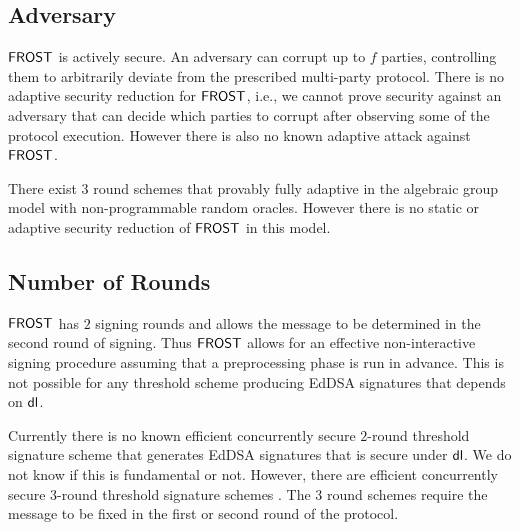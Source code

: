 
\subsection{Adversary}\label{section:comparisons:adversary}
$\mathsf{FROST}$ is actively secure.  An adversary can corrupt up to $f$ parties, controlling them to arbitrarily deviate from the prescribed multi-party protocol.
There is no adaptive security reduction for $\mathsf{FROST}$, i.e., we cannot prove security against an adversary that can decide which parties to corrupt after observing some of the protocol execution.
However there is also no known adaptive attack against $\mathsf{FROST}$.


There exist $3$ round schemes that provably fully adaptive \cite{} in the algebraic group model with non-programmable random oracles.  However there is no static or adaptive security reduction of $\mathsf{FROST}$ in this model.  

\subsection{Number of Rounds}\label{section:comparisons:rounds}
$\mathsf{FROST}$ has $2$ signing rounds and allows the message to be determined in the second round of signing.
Thus $\mathsf{FROST}$ allows for an effective non-interactive signing procedure assuming that a preprocessing phase is run in advance.
This is not possible for any threshold scheme producing EdDSA signatures that depends on $\mathsf{dl}$.

Currently there is no known efficient concurrently secure $2$-round threshold signature scheme that generates EdDSA signatures that is secure under $\mathsf{dl}$.
We do not know if this is fundamental or not.  However, there are efficient concurrently secure $3$-round threshold signature schemes \cite{Lindell22,Makriyannis22,CritesKM23}.
The $3$ round schemes require the message to be fixed in the first or second round of the protocol.

